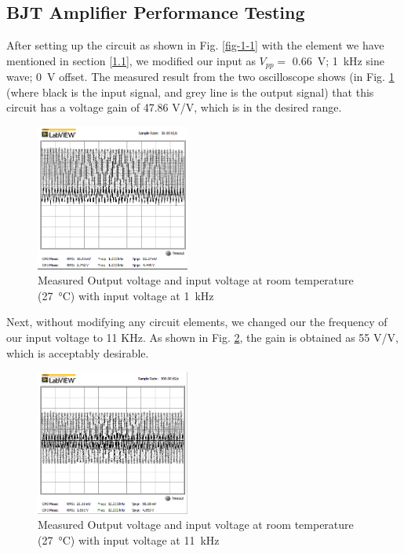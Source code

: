 \documentclass[journal]{IEEEtran}
\begin{document}
\subsection{BJT Amplifier Performance Testing}
\par After setting up the circuit as shown in  Fig. \ref{fig-1-1} with the element we have mentioned in section \ref{1.1}, we modified our input as $V_{pp} =$ \SI{0.66}{\volt}; \SI{1}{\kilo\hertz} sine wave; \SI{0}{\volt} offset. The measured result from the two oscilloscope shows (in Fig. \ref{fig-2-1} (where black is the input signal, and grey line is the output signal) that this circuit has a voltage gain of 47.86 \si{\volt}/\si{\volt}, which is in the desired range.
\begin{figure}[h]
  \centering
  \includegraphics[width=0.45\textwidth]{images/2-1.png}
  \caption{Measured Output voltage and input voltage at room temperature (\SI{27}{\celsius}) with input voltage at \SI{1}{\kilo\hertz}}
  \label{fig-2-1}
\end{figure}
\clearpage
\par Next, without modifying any circuit elements, we changed our the frequency of our
input voltage to 11 KHz. As shown in Fig. \ref{fig-2-2}, the gain is obtained as 55 \si{\volt}/\si{\volt}, which is
acceptably desirable.
\begin{figure}[h]
\centering
\includegraphics[width=0.45\textwidth]{images/2-2.png}
  \caption{Measured Output voltage and input voltage at room temperature (\SI{27}{\celsius}) with input voltage at \SI{11}{\kilo\hertz}}
\label{fig-2-2}
\end{figure}
\end{document}
